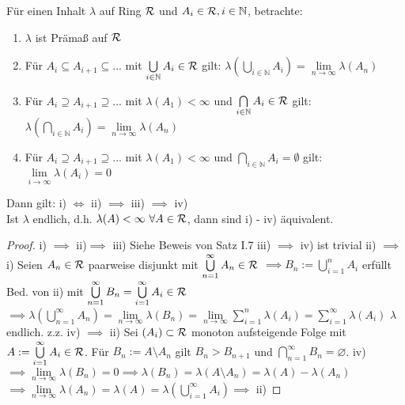 \documentclass[11pt,a4paper,fleqn,openany]{report}
\begin{document}
    \begin{theorem}[(i.A. II.31)]
      Für einen Inhalt $\lambda$ auf Ring $\mathcal{R}$ und $A_i \in \mathcal{R}, i \in \mathbb{N}$, betrachte:
      \begin{enumerate}[label=\roman*)]
        \item $\lambda$ ist Prämaß auf $\mathcal{R}$
        \item Für $A_i \subseteq A_{i+1} \subseteq ...$ mit $\bigcup\limits_{i \in \mathbb{N}} A_i \in \mathcal{R}$ gilt: $\lambda(\bigcup\limits_{i \in \mathbb{N}} A_i) = \lim\limits_{n \to \infty} \lambda(A_n)$
        \item Für $A_i \supseteq A_{i+1} \supseteq ...$ mit $\lambda(A_1) < \infty$ und $\bigcap\limits_{i \in \mathbb{N}} A_i \in \mathcal{R}$ gilt:\\
        $\lambda(\bigcap\limits_{i \in \mathbb{N}} A_i) = \lim\limits_{n \to \infty} \lambda(A_n)$
        \item Für $A_i \supseteq A_{i+1} \supseteq ...$ mit $\lambda(A_1) < \infty$ und $\bigcap\limits_{i \in \mathbb{N}} A_i = \emptyset$ gilt: $\lim\limits_{i \to \infty} \lambda(A_i) = 0$
      \end{enumerate} 
      Dann gilt: i) $\Leftrightarrow$ ii) $\implies$ iii) $\implies$ iv)\\
      Ist $\lambda$ endlich, d.h. $\lambda(A) < \infty \ \forall A \in \script{R}$, dann sind i) - iv) äquivalent.
    \end{theorem}

    \begin{proof}
      i) $\implies$ ii)$ \implies$ iii) Siehe Beweis von Satz I.7 \newline
      iii) $\implies$ iv) ist trivial \newline
      ii) $\implies$ i) Seien $A_n\in\mathcal{R}$ paarweise disjunkt mit $\bigcup\limits_{n=1}^{\infty}A_n\in\mathcal{R}$ \newline
      $\implies B_n := \bigcup\limits_{i=1}^{n}A_i$ erfüllt Bed. von ii) mit $\bigcup\limits_{n=1}^{\infty}B_n = \bigcup\limits_{i=1}^{\infty}A_i\in\mathcal{R}$ \newline
      $\implies \lambda(\bigcup\limits_{n=1}^{\infty}A_n) = \lim\limits_{n\to\infty} \lambda(B_n) = \lim\limits_{n\to\infty} \sum\limits_{i=1}^{n}\lambda(A_i) = \sum\limits_{i=1}^{\infty}\lambda(A_i)$ \newline
      $\lambda$ endlich. z.z. iv) $\implies$ ii) \newline
      Sei $(A_i)\subset\mathcal{R}$ monoton aufsteigende Folge mit $A := \bigcup\limits_{i=1}^{\infty}A_i\in\mathcal{R}$. Für $B_n := A\setminus A_n$ gilt $B_n > B_{n+1}$ und $\bigcap\limits_{n=1}^{\infty}B_n = \varnothing$. \newline
      iv) $\implies \lim\limits_{n\to\infty}\lambda(B_n) = 0 \implies \lambda(B_n) = \lambda(A\setminus A_n) = \lambda(A) - \lambda(A_n)$ \newline
      $\implies \lim\limits_{n\to\infty}\lambda(A_n) = \lambda(A) = \lambda(\bigcup\limits_{i=1}^{\infty}A_i)\implies$ ii)
    \end{proof}
\end{document}
